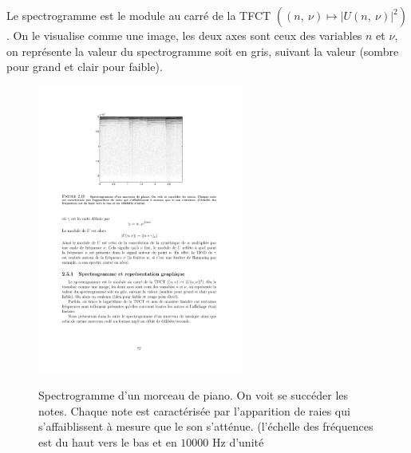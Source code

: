 \begin{definition}
Le spectrogramme est le module au carr\'{e} de la TFCT $((n,\ \nu)\mapsto|U(n,\ \nu)|^{2})$ . On le visualise comme une image, les deux axes sont ceux des variables $n$ et $\nu$, on repr\'{e}sente la valeur du spectrogramme soit en gris, suivant la valeur (sombre pour grand et clair pour faible). 

\begin{figure}
  \centering
  \includegraphics[width=0.6\textwidth]{Figures/Figure2-19}\\
  \caption{Spectrogramme d'un morceau de piano. On voit se succ\'{e}der les notes. Chaque note est caract\'{e}ris\'{e}e par l'apparition de raies qui s'affaiblissent \`{a} mesure que le son s'att\'{e}nue. (l'\'{e}chelle des fr\'{e}quences est du haut vers le bas et en $10000$ Hz d'unit\'{e}}\label{fig:figure2-19}
\end{figure}




\end{definition}
